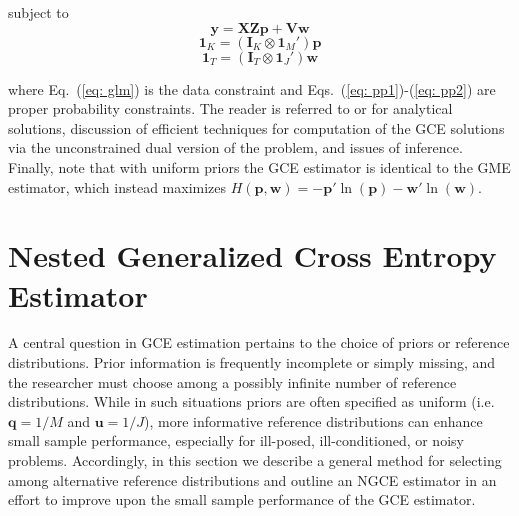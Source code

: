 \documentclass[english]{article}
\begin{document}
\noindent
subject to
\begin{equation}
\mathbf{y} = \mathbf{X Z p} 
+ \mathbf{V w}
\label{eq: glm}
\end{equation}
\begin{equation}
\mathbf{1}_K = (\mathbf{I}_K \otimes \mathbf{1}_M')\mathbf{p}
\label{eq: pp1}
\end{equation}
\begin{equation}
\mathbf{1}_T = (\mathbf{I}_T \otimes \mathbf{1}_J')\mathbf{w}
\label{eq: pp2}
\end{equation}

\noindent
where Eq.\ (\ref{eq: glm}) is the data constraint and Eqs.\ 
(\ref{eq: pp1})-(\ref{eq: pp2}) are proper probability constraints.
The reader is referred to \citet[Chap.\ 6]{golan1996} or 
\citet[Chap.\ 6]{golan2008} for analytical solutions, discussion of 
efficient techniques for computation of the GCE solutions via the 
unconstrained dual version of the problem, and issues of inference.
Finally, note that with uniform priors the GCE estimator is identical to 
the GME estimator, which instead maximizes $H(\mathbf{p},\mathbf{w}) 
= - \mathbf{p}' \ln (\mathbf{p}) - \mathbf{w}' \ln (\mathbf{w})$.


\section{Nested Generalized Cross Entropy Estimator}
\label{sec: ngce}

A central question in GCE estimation pertains to the choice of 
priors or reference distributions.
Prior information is frequently incomplete or simply missing, and 
the researcher must choose among a possibly infinite number of 
reference distributions. 
While in such situations priors are often specified as uniform (i.e.\ 
$\mathbf{q}=1/M$ and $\mathbf{u}=1/J$), more informative 
reference distributions can enhance small sample performance, especially 
for ill-posed, ill-conditioned, or noisy problems.
Accordingly, in this section we describe a general method for selecting among 
alternative reference distributions and outline an NGCE estimator in an 
effort to improve upon the small sample performance of the GCE estimator. 
\end{document}
